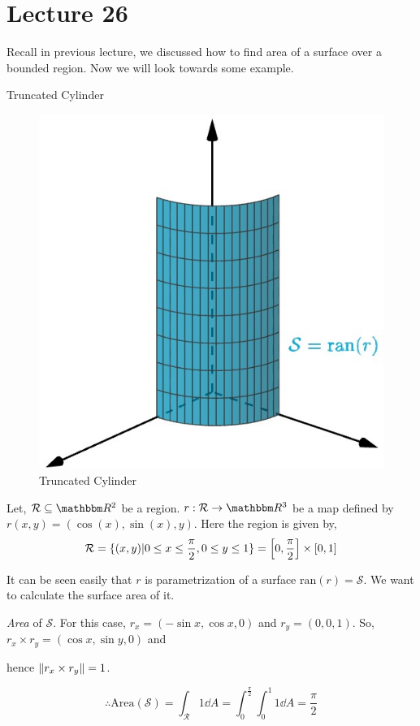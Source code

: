 \documentclass[Analysis-3]{subfiles}
\begin{document}
\chapter*{Lecture 26} %
\setcounter{chapter}{26} %
\setcounter{section}{0}

Recall in previous lecture, we discussed how to find area of a surface over a bounded region. Now we will look towards some example. 

\begin{Eg}{Truncated Cylinder}{}
    
    \begin{figure}
        \centering
        \includegraphics[width=.78\linewidth]{figures/lec-26.1.png}
        \caption{Truncated Cylinder}
    \end{figure}

 Let, $\mathcal{R} \subseteq \R^2$ be a region. $r : \mathcal{R} \to \R^3$ be a map defined by $r(x,y) = (\cos(x),\sin(x),y)$. Here the region is given by, 
\[\mathcal{R} = \{(x,y) | 0 \le x \le \frac{\pi}{2} , 0\le y \le 1\} = \qty[0,\frac{\pi}{2}] \times [0,1] \]

It can be seen easily that $r$ is parametrization of a surface $\text{ran}(r) = \mathcal{S}$. We want to calculate the surface area of it.

\textit{Area} of $\mathcal{S}$. For this case, $r_x = (-\sin x, \cos x, 0)$ and $r_y =(0,0,1)$. So, $ r_x \times r_y = (\cos x, \sin y,0)$ and 

\vspace{0.1cm}

hence $\norm{r_x \times r_y} = 1$.

\[\therefore \text{Area}(\mathcal{S}) = \int_{\mathcal{R}} 1 \dd A = \int_0^{\frac{\pi}{2}} \int_{0}^1 1 \dd A = \frac{\pi}{2}\]

\end{Eg}
\end{document}
